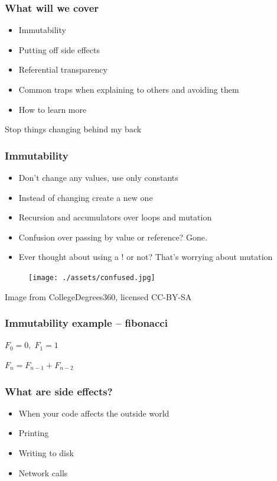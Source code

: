 \documentclass[aspectratio=169]{beamer}
\begin{document}
\begin{frame}
  \frametitle{What will we cover}
  \begin{itemize}
    \item Immutability
    \item Putting off side effects
    \item Referential transparency
    \item Common traps when explaining to others and avoiding them
    \item How to learn more
  \end{itemize}
\end{frame}

\begin{frame}
  \begin{center}
    \Huge Stop things changing behind my back
  \end{center}
\end{frame}

\begin{frame}
  \frametitle{Immutability}
  \begin{itemize}
    \item Don't change any values, use only constants
    \item Instead of changing create a new one
    \item Recursion and accumulators over loops and mutation
    \item Confusion over passing by value or reference? Gone.
    \item Ever thought about using a ! or not? That's worrying about mutation
  \end{itemize}
\end{frame}

\begin{frame}
  \begin{figure}[p]
    \texttt{[image: ./assets/confused.jpg]}
  \end{figure}
  \tiny Image from CollegeDegrees360, licensed CC-BY-SA
\end{frame}

\begin{frame}
  \frametitle{Immutability example -- fibonacci}
  $ F_0 = 0,\; F_1 = 1$

  $F_n = F_{n-1} + F_{n-2}$
\end{frame}

\begin{frame}
  \frametitle{What are side effects?}
  \begin{itemize}
    \item When your code affects the outside world
    \item Printing
    \item Writing to disk
    \item Network calls
  \end{itemize}
\end{frame}
\end{document}
